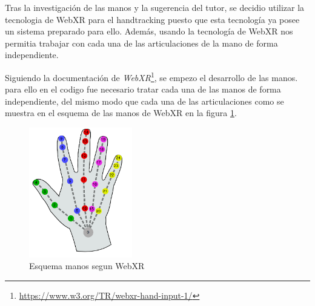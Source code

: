 \documentclass[a4paper, 12pt]{book}
\begin{document}
Tras la investigación de las manos y la sugerencia del tutor, se decidio utilizar la tecnologia de WebXR para el handtracking puesto que esta tecnología ya posee un sistema preparado para ello. Además, usando la tecnología de WebXR nos permitia trabajar con cada una de las articulaciones de la mano de forma independiente. 

Siguiendo la documentación de \textit{WebXR}\footnote{\url{https://www.w3.org/TR/webxr-hand-input-1/}}, se empezo el desarrollo de las manos. para ello en el codigo fue necesario tratar cada una de las manos de forma independiente, del mismo modo que cada una de las articulaciones como se muestra en el esquema de las manos de WebXR en la figura \ref{fig:WebXR-manos}. 

\begin{figure}[H] 
  \centering
  \includegraphics[width=0.4\textwidth]{img/webxr-mano.png} 
  \caption{Esquema manos segun WebXR}
  \label{fig:WebXR-manos}
\end{figure}
\end{document}
